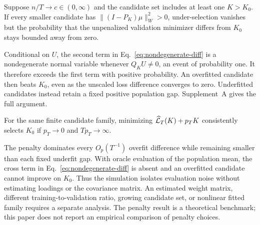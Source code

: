 \begin{proposition}
\label{prop:inconsistency}
Suppose $n/T\to c\in(0,\infty)$ and the candidate set includes at least one $K>K_0$. If every smaller candidate has $\|(I-P_K)\mu\|_W^2>0$, under-selection vanishes but the probability that the unpenalized validation minimizer differs from $K_0$ stays bounded away from zero.
\end{proposition}

Conditional on $U$, the second term in Eq.~\eqref{eq:nondegenerate-diff} is a nondegenerate normal variable whenever $Q_KU\ne0$, an event of probability one. It therefore exceeds the first term with positive probability. An overfitted candidate then beats $K_0$, even as the unscaled loss difference converges to zero. Underfitted candidates instead retain a fixed positive population gap. Supplement~A gives the full argument.

\begin{corollary}
\label{cor:penalty}
For the same finite candidate family, minimizing $\widehat{\mathcal{L}}_T(K)+p_TK$ consistently selects $K_0$ if $p_T\to0$ and $Tp_T\to\infty$.
\end{corollary}

The penalty dominates every $O_p(T^{-1})$ overfit difference while remaining smaller than each fixed underfit gap. With oracle evaluation of the population mean, the cross term in Eq.~\eqref{eq:nondegenerate-diff} is absent and an overfitted candidate cannot improve on $K_0$. Thus the simulation isolates evaluation noise without estimating loadings or the covariance matrix. An estimated weight matrix, different training-to-validation ratio, growing candidate set, or nonlinear fitted family requires a separate analysis. The penalty result is a theoretical benchmark; this paper does not report an empirical comparison of penalty choices.
